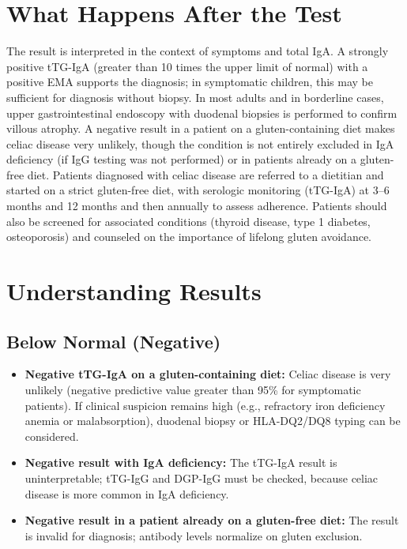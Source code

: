 \section*{What Happens After the Test}
The result is interpreted in the context of symptoms and total IgA. A strongly positive tTG-IgA (greater than 10 times the upper limit of normal) with a positive EMA supports the diagnosis; in symptomatic children, this may be sufficient for diagnosis without biopsy. In most adults and in borderline cases, upper gastrointestinal endoscopy with duodenal biopsies is performed to confirm villous atrophy. A negative result in a patient on a gluten-containing diet makes celiac disease very unlikely, though the condition is not entirely excluded in IgA deficiency (if IgG testing was not performed) or in patients already on a gluten-free diet. Patients diagnosed with celiac disease are referred to a dietitian and started on a strict gluten-free diet, with serologic monitoring (tTG-IgA) at 3--6 months and 12 months and then annually to assess adherence. Patients should also be screened for associated conditions (thyroid disease, type 1 diabetes, osteoporosis) and counseled on the importance of lifelong gluten avoidance.

\section*{Understanding Results}

\subsection*{Below Normal (Negative)}
\begin{itemize}
  \item \textbf{Negative tTG-IgA on a gluten-containing diet:} Celiac disease is very unlikely (negative predictive value greater than 95\% for symptomatic patients). If clinical suspicion remains high (e.g., refractory iron deficiency anemia or malabsorption), duodenal biopsy or HLA-DQ2/DQ8 typing can be considered.
  \item \textbf{Negative result with IgA deficiency:} The tTG-IgA result is uninterpretable; tTG-IgG and DGP-IgG must be checked, because celiac disease is more common in IgA deficiency.
  \item \textbf{Negative result in a patient already on a gluten-free diet:} The result is invalid for diagnosis; antibody levels normalize on gluten exclusion.
\end{itemize}

